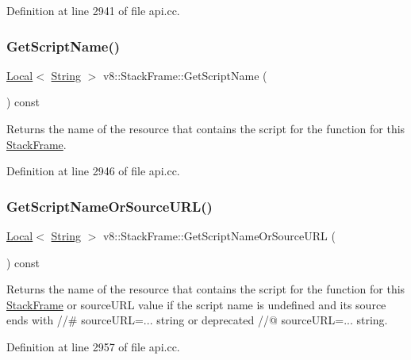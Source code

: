 Definition at line 2941 of file api.\+cc.

\mbox{\label{classv8_1_1StackFrame_a50ef64008d600ab075e048debbca9214}} 
\subsubsection{\texorpdfstring{Get\+Script\+Name()}{GetScriptName()}}
{\footnotesize\ttfamily \mbox{\hyperlink{classv8_1_1Local}{Local}}$<$ \mbox{\hyperlink{classv8_1_1String}{String}} $>$ v8\+::\+Stack\+Frame\+::\+Get\+Script\+Name (\begin{DoxyParamCaption}{ }\end{DoxyParamCaption}) const}

Returns the name of the resource that contains the script for the function for this \mbox{\hyperlink{classv8_1_1StackFrame}{Stack\+Frame}}. 

Definition at line 2946 of file api.\+cc.

\mbox{\label{classv8_1_1StackFrame_a57754ab8d2eb6d899289d5dfe1c9d4a3}} 
\subsubsection{\texorpdfstring{Get\+Script\+Name\+Or\+Source\+U\+R\+L()}{GetScriptNameOrSourceURL()}}
{\footnotesize\ttfamily \mbox{\hyperlink{classv8_1_1Local}{Local}}$<$ \mbox{\hyperlink{classv8_1_1String}{String}} $>$ v8\+::\+Stack\+Frame\+::\+Get\+Script\+Name\+Or\+Source\+U\+RL (\begin{DoxyParamCaption}{ }\end{DoxyParamCaption}) const}

Returns the name of the resource that contains the script for the function for this \mbox{\hyperlink{classv8_1_1StackFrame}{Stack\+Frame}} or source\+U\+RL value if the script name is undefined and its source ends with //\# source\+U\+RL=... string or deprecated //@ source\+U\+RL=... string. 

Definition at line 2957 of file api.\+cc.

